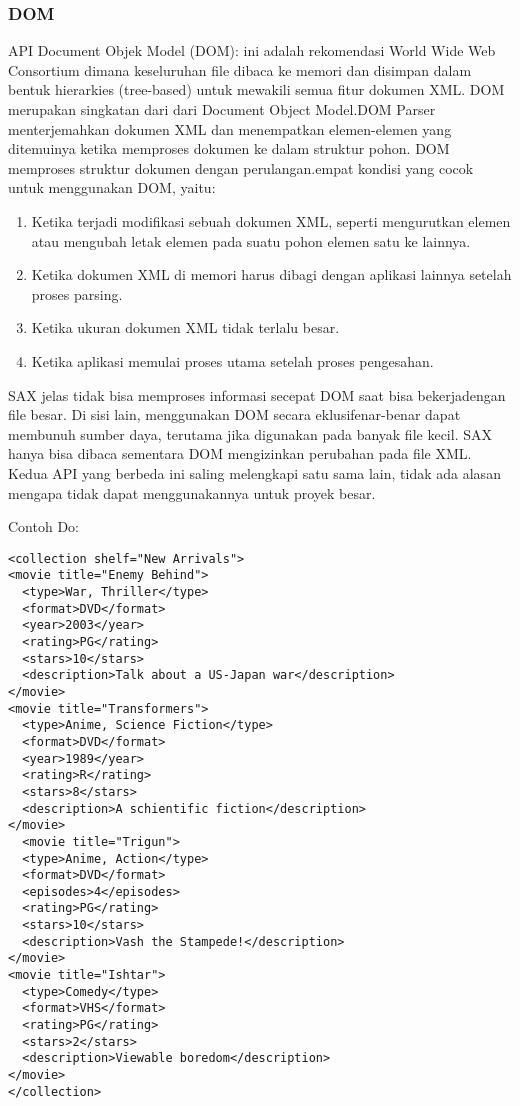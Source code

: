 \subsubsection {DOM}
  API Document Objek Model (DOM): ini adalah rekomendasi World Wide Web Consortium dimana keseluruhan file dibaca ke memori dan disimpan dalam bentuk hierarkies (tree-based) untuk mewakili semua fitur dokumen XML. DOM merupakan singkatan dari dari Document Object Model.DOM Parser menterjemahkan dokumen XML dan menempatkan elemen-elemen yang ditemuinya ketika memproses dokumen ke dalam struktur pohon.
  DOM memproses struktur dokumen dengan perulangan.empat kondisi yang cocok untuk menggunakan DOM, yaitu:
\begin{enumerate}
\item Ketika terjadi modifikasi sebuah dokumen XML, seperti mengurutkan elemen atau mengubah letak elemen pada suatu pohon elemen satu ke lainnya.
\item Ketika dokumen XML di memori harus dibagi dengan aplikasi lainnya setelah proses parsing.
\item Ketika ukuran dokumen XML tidak terlalu besar.
\item Ketika aplikasi memulai proses utama setelah proses pengesahan.
\end{enumerate}

SAX jelas tidak bisa memproses informasi secepat DOM saat bisa bekerjadengan file besar. Di sisi lain, menggunakan DOM secara eklusifenar-benar dapat membunuh sumber daya, terutama jika digunakan pada banyak file kecil. SAX hanya bisa dibaca sementara DOM mengizinkan perubahan pada file XML. Kedua API yang berbeda ini saling melengkapi satu sama lain, tidak ada alasan mengapa tidak dapat menggunakannya untuk proyek besar. 

Contoh Do: 
\begin{verbatim}
<collection shelf="New Arrivals"> 
<movie title="Enemy Behind"> 
  <type>War, Thriller</type> 
  <format>DVD</format> 
  <year>2003</year> 
  <rating>PG</rating> 
  <stars>10</stars>
  <description>Talk about a US-Japan war</description> 
</movie> 
<movie title="Transformers"> 
  <type>Anime, Science Fiction</type> 
  <format>DVD</format> 
  <year>1989</year> 
  <rating>R</rating> 
  <stars>8</stars> 
  <description>A schientific fiction</description> 
</movie> 
  <movie title="Trigun"> 
  <type>Anime, Action</type> 
  <format>DVD</format> 
  <episodes>4</episodes>  
  <rating>PG</rating> 
  <stars>10</stars> 
  <description>Vash the Stampede!</description> 
</movie>
<movie title="Ishtar"> 
  <type>Comedy</type> 
  <format>VHS</format> 
  <rating>PG</rating> 
  <stars>2</stars> 
  <description>Viewable boredom</description> 
</movie> 
</collection> 
\end{verbatim}


